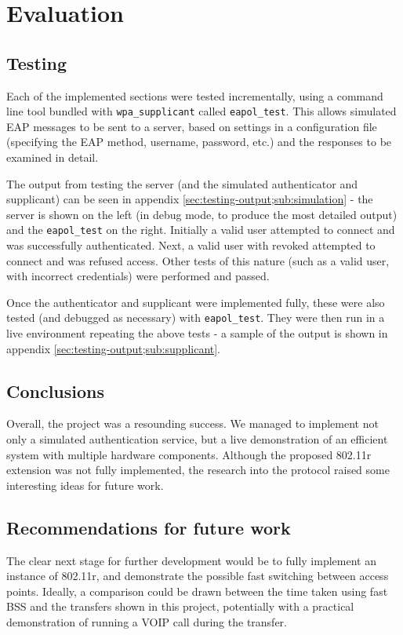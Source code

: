 \documentclass[12pt,a4paper,titlepage]{article}
\begin{document}
\newpage
\section{Evaluation}

\subsection{Testing}
\label{sec:evaluation;sub:testing}
Each of the implemented sections were tested incrementally, using a command line tool bundled with \texttt{wpa\_supplicant} called \texttt{eapol\_test}. This allows simulated EAP messages to be sent to a server, based on settings in a configuration file (specifying the EAP method, username, password, etc.) and the responses to be examined in detail. 

The output from testing the server (and the simulated authenticator and supplicant) can be seen in appendix \ref{sec:testing-output;sub:simulation} - the server is shown on the left (in debug mode, to produce the most detailed output) and the \texttt{eapol\_test} on the right. Initially a valid user attempted to connect and was successfully authenticated. Next, a valid user with revoked attempted to connect and was refused access. Other tests of this nature (such as a valid user, with incorrect credentials) were performed and passed.

Once the authenticator and supplicant were implemented fully, these were also tested (and debugged as necessary) with \texttt{eapol\_test}. They were then run in a live environment repeating the above tests - a sample of the output is shown in appendix \ref{sec:testing-output;sub:supplicant}.

\subsection{Conclusions}
Overall, the project was a resounding success. We managed to implement not only a simulated authentication service, but a live demonstration of an efficient system with multiple hardware components. Although the proposed 802.11r extension was not fully implemented, the research into the protocol raised some interesting ideas for future work.

\subsection{Recommendations for future work}
The clear next stage for further development would be to fully implement an instance of 802.11r, and demonstrate the possible fast switching between access points. Ideally, a comparison could be drawn between the time taken using fast BSS and the transfers shown in this project, potentially with a practical demonstration of running a VOIP call during the transfer.
\end{document}
